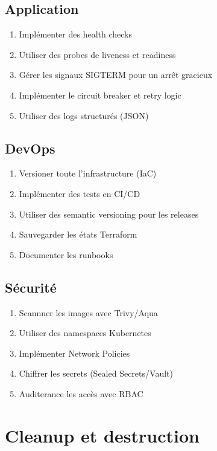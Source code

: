 \documentclass[12pt,a4paper,twoside]{report}
\begin{document}
\subsection{Application}

\begin{enumerate}
    \item Implémenter des health checks
    \item Utiliser des probes de liveness et readiness
    \item Gérer les signaux SIGTERM pour un arrêt gracieux
    \item Implémenter le circuit breaker et retry logic
    \item Utiliser des logs structurés (JSON)
\end{enumerate}

\subsection{DevOps}

\begin{enumerate}
    \item Versioner toute l'infrastructure (IaC)
    \item Implémenter des tests en CI/CD
    \item Utiliser des semantic versioning pour les releases
    \item Sauvegarder les états Terraform
    \item Documenter les runbooks
\end{enumerate}

\subsection{Sécurité}

\begin{enumerate}
    \item Scannner les images avec Trivy/Aqua
    \item Utiliser des namespaces Kubernetes
    \item Implémenter Network Policies
    \item Chiffrer les secrets (Sealed Secrets/Vault)
    \item Auditerance les accès avec RBAC
\end{enumerate}

\section{Cleanup et destruction}
\end{document}
